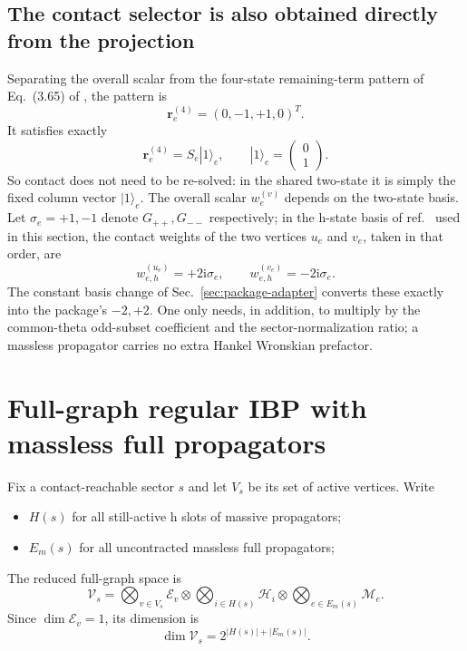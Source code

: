 \documentclass[11pt,a4paper]{article}
\newcommand{\ii}{\mathrm i}
\newcommand{\cV}{\mathcal V}
\newcommand{\cE}{\mathcal E}
\newcommand{\cH}{\mathcal H}
\newcommand{\cM}{\mathcal M}
\begin{document}
\subsection{The contact selector is also obtained directly from the projection}

Separating the overall scalar from the four-state remaining-term pattern of Eq.~(3.65) of \cite{Chen:2023eic}, the pattern is
\begin{equation}
 \bm r_e^{(4)}=(0,-1,+1,0)^T.
\end{equation}
It satisfies exactly
\begin{equation}
 \bm r_e^{(4)}=S_e|1\rangle_e,
 \qquad
 |1\rangle_e=\begin{pmatrix}0\\1\end{pmatrix}.
 \label{eq:contact-vector-projection}
\end{equation}
So contact does not need to be re-solved: in the shared two-state it is simply the fixed column vector $|1\rangle_e$. The overall scalar $w_e^{(v)}$ depends on the two-state basis. Let $\sigma_e=+1,-1$ denote $G_{++},G_{--}$ respectively; in the h-state basis of ref.~\cite{Chen:2023eic} used in this section, the contact weights of the two vertices $u_e$ and $v_e$, taken in that order, are
\begin{equation}
 w_{e,h}^{(u_e)}=+2\ii\sigma_e,
 \qquad
 w_{e,h}^{(v_e)}=-2\ii\sigma_e.
 \label{eq:h-massless-contact-weight}
\end{equation}
The constant basis change of Sec.~\ref{sec:package-adapter} converts these exactly into the package's $-2,+2$. One only needs, in addition, to multiply by the common-theta odd-subset coefficient and the sector-normalization ratio; a massless propagator carries no extra Hankel Wronskian prefactor.

\section{Full-graph regular IBP with massless full propagators}

Fix a contact-reachable sector $s$ and let $V_s$ be its set of active vertices. Write
\begin{itemize}
  \item $H(s)$ for all still-active h slots of massive propagators;
  \item $E_m(s)$ for all uncontracted massless full propagators;
\end{itemize}
The reduced full-graph space is
\begin{equation}
 \boxed{
 \cV_s
 =\bigotimes_{v\in V_s}\cE_v
 \otimes\bigotimes_{i\in H(s)}\cH_i
 \otimes\bigotimes_{e\in E_m(s)}\cM_e.
 }
 \label{eq:global-reduced-space}
\end{equation}
Since $\dim\cE_v=1$, its dimension is
\begin{equation}
 \dim\cV_s=2^{|H(s)|+|E_m(s)|}.
\end{equation}
\end{document}
